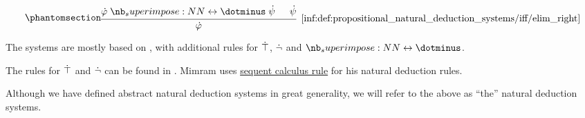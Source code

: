 \begin{definition}
\begin{thmenum}
\begin{paracol}{3}
      \begin{nthcolumn}{2}
        \ParacolAlignmentHack
        \begin{equation*}\taglabel[\ensuremath{ \leftrightarrow_{-R} }]{inf:def:propositional_natural_deduction_systems/iff/elim_right}
          \begin{prooftree}
            \hypo{ \syn\varphi \syniff \syn\psi }
            \hypo{ \syn\psi }
            \infer2[\ref{inf:def:propositional_natural_deduction_systems/iff/elim_right}]{ \syn\varphi }
          \end{prooftree}
        \end{equation*}
      \end{nthcolumn}
    \end{paracol}
  \end{thmenum}
\end{definition}
\begin{comments}
  \item The systems are mostly based on \cite[def. 2.1.1]{TroelstraSchwichtenberg2000BasicProofTheory}, with additional rules for \( \dot{\top} \), \( \dot{\neg} \) and \( \syniff \).

  The rules for \( \dot{\top} \) and \( \dot{\neg} \) can be found in \cite[fig. 2.5]{Mimram2020ProgramEqualsProof}. Mimram uses \hyperref[def:abstract_sequent_calculus_system]{sequent calculus rule} for his natural deduction rules.

  \item Although we have defined abstract natural deduction systems in great generality, we will refer to the above as \enquote{the} natural deduction systems.
\end{comments}


